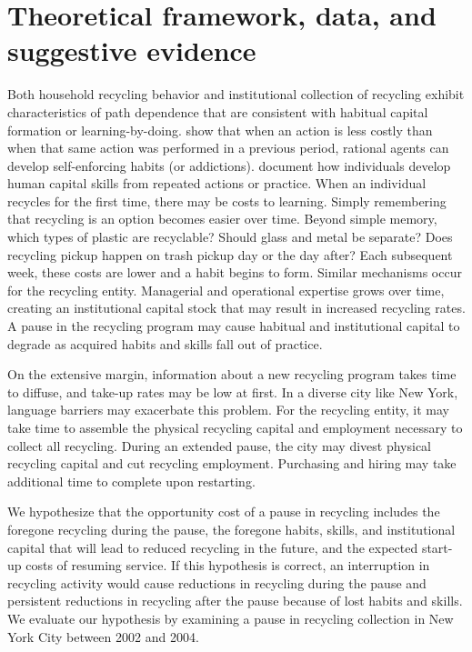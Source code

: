 \documentclass[12pt]{article}
\begin{document}
\section{Theoretical framework, data, and suggestive evidence}

Both household recycling behavior and institutional collection of recycling exhibit characteristics of path dependence that are consistent with habitual capital formation or learning-by-doing.  \cite{beckermurphy1988} show that when an action is less costly than when that same action was performed in a previous period, rational agents can develop self-enforcing habits (or addictions).  \cite{fosterrosenzweig1995} document how individuals develop human capital skills from repeated actions or practice.  When an individual recycles for the first time, there may be costs to learning.  Simply remembering that recycling is an option becomes easier over time.  Beyond simple memory, which types of plastic are recyclable?  Should glass and metal be separate?  Does recycling pickup happen on trash pickup day or the day after?  Each subsequent week, these costs are lower and a habit begins to form.  Similar mechanisms occur for the recycling entity.  Managerial and operational expertise grows over time, creating an institutional capital stock that may result in increased recycling rates.  A pause in the recycling program may cause habitual and institutional capital to degrade as acquired habits and skills fall out of practice.

On the extensive margin, information about a new recycling program takes time to diffuse, and take-up rates may be low at first.  In a diverse city like New York, language barriers may exacerbate this problem.  For the recycling entity, it may take time to assemble the physical recycling capital and employment necessary to collect all recycling.  During an extended pause, the city may divest physical recycling capital and cut recycling employment.  Purchasing and hiring may take additional time to complete upon restarting.

We hypothesize that the opportunity cost of a pause in recycling includes the foregone recycling during the pause, the foregone habits, skills, and institutional capital that will lead to reduced recycling in the future, and the expected start-up costs of resuming service.  If this hypothesis is correct, an interruption in recycling activity would cause reductions in recycling during the pause and persistent reductions in recycling after the pause because of lost habits and skills.  We evaluate our hypothesis by examining a pause in recycling collection in New York City between 2002 and 2004.
\end{document}
